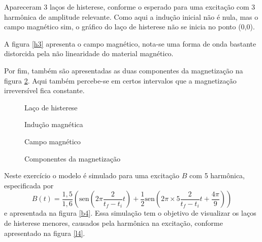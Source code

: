 \documentclass{homeworg}
\begin{document}
\hspace{1cm} Apareceram 3 laços de histerese, conforme o esperado para uma excitação com {3\textordfeminine} harmônica de amplitude relevante. Como aqui a indução inicial não é nula, mas o campo magnético sim, o gráfico do laço de histerese não se inicia no ponto (0,0).

\hspace{1cm} A figura \ref{h3} apresenta o campo magnético, nota-se uma forma de onda bastante distorcida pela não linearidade do material magnético.

\hspace{1cm} Por fim, também são apresentadas as duas componentes da magnetização na figura \ref{c3}. Aqui também percebe-se em certos intervalos que a magnetização irreversível fica constante.

\begin{figure}[!h]
  \begin{minipage}{.49\linewidth}
    \centering
    
    \vspace{-.5cm}
    \caption{Laço de histerese}
    \label{b3}
  \end{minipage}
  \begin{minipage}{.49\linewidth}
    \centering
    
    \vspace{-.5cm}
    \caption{Indução magnética}
    \label{l3}
  \end{minipage}
\end{figure}
\begin{figure}[!h]
  \begin{minipage}{.49\linewidth}
    \centering
    
    \vspace{-.5cm}
    \caption{Campo magnético}
    \label{h3}
  \end{minipage}%
  \begin{minipage}{.49\linewidth}
    \centering
    
    \vspace{-.5cm}
    \caption{Componentes da magnetização}
    \label{c3}
  \end{minipage}%
\end{figure}

\exercise

\hspace{1cm} Neste exercício o modelo é simulado para uma excitação $B$ com {5\textordfeminine} harmônica, especificada por
\begin{equation}
  B(t) = \frac{1,5}{1,6} \left(\mathrm{sen}\left(2\pi \frac{2}{t_f-t_i} t\right) + \frac{1}{2} \mathrm{sen}\left(2\pi\times 5 \frac{2}{t_f-t_i} t + \frac{4\pi}{9}\right)\right)
\end{equation}
e apresentada na figura \ref{b4}. Essa simulação tem o objetivo de visualizar os laços de histerese menores, causados pela harmônica na excitação, conforme apresentado na figura \ref{l4}.
\end{document}
